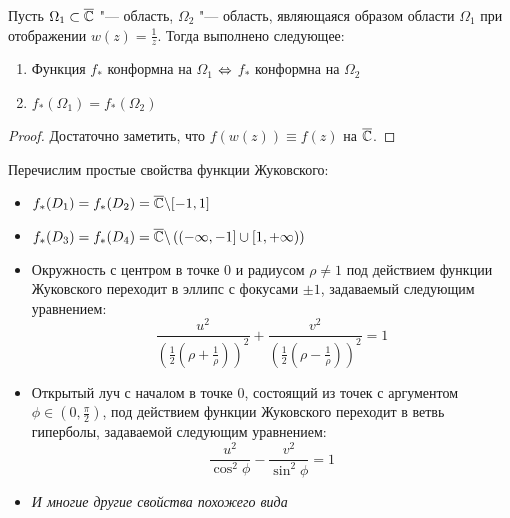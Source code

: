 \begin{proposition}
	Пусть $\Omega_1 \subset \overline{\mathbb{C}}$ "--- область, $\Omega_2$ "--- область, являющаяся образом области $\Omega_1$ при отображении $w(z) = \frac 1z$. Тогда выполнено следующее:
	\begin{enumerate}
		\item Функция $f_*$ конформна на $\Omega_1$ $\Leftrightarrow$ $f_*$ конформна на $\Omega_2$
		\item $f_*(\Omega_1) = f_*(\Omega_2)$
	\end{enumerate}
\end{proposition}

\begin{proof}
	Достаточно заметить, что $f(w(z)) \equiv f(z)$ на $\overline{\mathbb{C}}$.
\end{proof}

\begin{note}
	Перечислим простые свойства функции Жуковского:
	\begin{itemize}
		\item $f_*(D_1) = f_*(D_2) = \overline{\mathbb{C}} \backslash [-1, 1]$
		\item $f_*(D_3) = f_*(D_4) = \overline{\mathbb{C}} \backslash \left((-\infty, -1] \cup [1, +\infty)\right)$
		\item Окружность с центром в точке $0$ и радиусом $\rho \ne 1$ под действием функции Жуковского переходит в эллипс с фокусами $\pm 1$, задаваемый следующим уравнением:
		\[\frac{u^2}{\left(\frac12\left(\rho + \frac 1\rho\right)\right)^2} + \frac{v^2}{\left(\frac12\left(\rho - \frac 1\rho\right)\right)^2} = 1\]
		\item Открытый луч с началом в точке $0$, состоящий из точек с аргументом $\phi \in \left(0, \frac\pi 2\right)$, под действием функции Жуковского переходит в ветвь гиперболы, задаваемой следующим уравнением:
		\[\frac{u^2}{\cos^2\phi} - \frac{v^2}{\sin^2\phi} = 1\]
		\item \textit{И многие другие свойства похожего вида}
	\end{itemize}
\end{note}